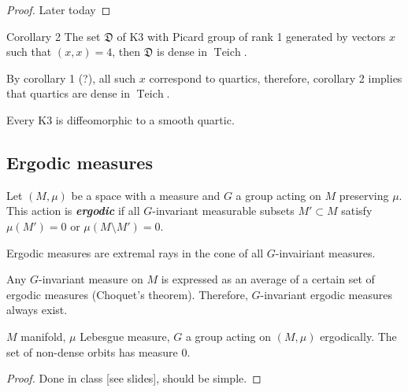 \begin{proof}\leavevmode
	Later today
\end{proof}

\begin{thing4}{Corollary 2}\leavevmode
	The set $\mathfrak{D}$ of K3 with Picard group of rank 1 generated by vectors $x$ such that  $(x,x)=4$, then $\mathfrak{D}$ is dense in $\operatorname{Teich}$.
\end{thing4}

\begin{remark}\leavevmode
	By corollary 1 (?), all such $x$ correspond to quartics, therefore, corollary 2 implies that quartics are dense in $\operatorname{Teich}$.
\end{remark}

\begin{coro}\leavevmode
	Every K3 is diffeomorphic to a smooth quartic.
\end{coro}

\subsection{Ergodic measures}

\begin{defn}\leavevmode
	Let $(M,\mu)$ be a space with a measure and $G$ a group acting on $M$ preserving $\mu$. This action is \textit{\textbf{ergodic}} if all $G$-invariant measurable subsets $M' \subset M $ satisfy $\mu(M')=0$ or $\mu(M\setminus M')=0$.
\end{defn}

\begin{remark}\leavevmode
	Ergodic measures are extremal rays in the cone of all $G$-invairiant measures.
\end{remark}

\begin{remark}\leavevmode
	Any $G$-invariant measure on $M$ is expressed as an average of a certain set of ergodic measures (Choquet's theorem). Therefore, $G$-invariant ergodic measures always exist.
\end{remark}

\begin{claim}\leavevmode
	$M$ manifold, $\mu$ Lebesgue measure, $G$ a group acting on $(M,\mu)$ ergodically. The set of non-dense orbits has measure 0.
\end{claim}

\begin{proof}\leavevmode
	Done in class [see slides], should be simple.
\end{proof}

